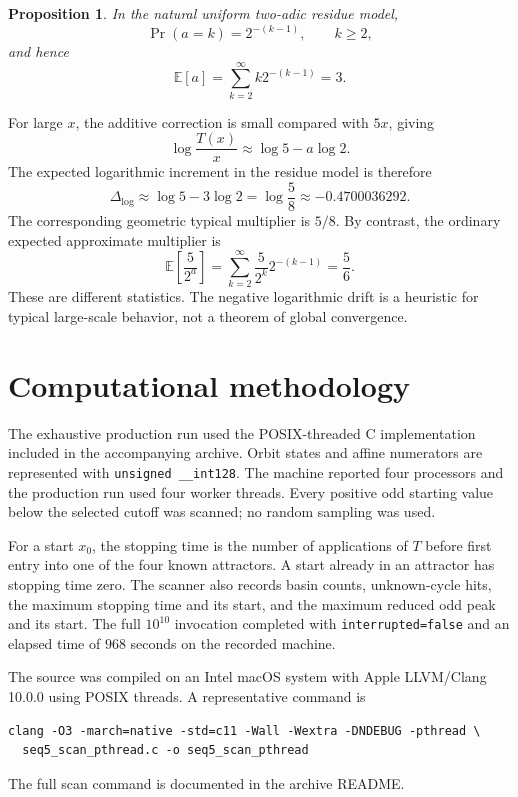 \documentclass[11pt]{article}
\newtheorem{proposition}{Proposition}
\begin{document}
\begin{proposition}
In the natural uniform two-adic residue model,
\begin{equation}
\Pr(a=k)=2^{-(k-1)},\qquad k\ge2,
\end{equation}
and hence
\begin{equation}
\mathbb E[a]=\sum_{k=2}^{\infty}k2^{-(k-1)}=3.
\end{equation}
\end{proposition}

For large $x$, the additive correction is small compared with $5x$, giving
\[
\log\frac{T(x)}x\approx\log5-a\log2.
\]
The expected logarithmic increment in the residue model is therefore
\begin{equation}
\Delta_{\log}\approx\log5-3\log2=\log\frac58\approx-0.4700036292.
\end{equation}
The corresponding geometric typical multiplier is $5/8$. By contrast, the ordinary expected approximate multiplier is
\[
\mathbb E\!\left[\frac5{2^a}\right]=\sum_{k=2}^{\infty}\frac5{2^k}2^{-(k-1)}=\frac56.
\]
These are different statistics. The negative logarithmic drift is a heuristic for typical large-scale behavior, not a theorem of global convergence.

\section{Computational methodology}
The exhaustive production run used the POSIX-threaded C implementation included in the accompanying archive. Orbit states and affine numerators are represented with \texttt{unsigned \_\_int128}. The machine reported four processors and the production run used four worker threads. Every positive odd starting value below the selected cutoff was scanned; no random sampling was used.

For a start $x_0$, the stopping time is the number of applications of $T$ before first entry into one of the four known attractors. A start already in an attractor has stopping time zero. The scanner also records basin counts, unknown-cycle hits, the maximum stopping time and its start, and the maximum reduced odd peak and its start. The full $10^{10}$ invocation completed with \texttt{interrupted=false} and an elapsed time of $968$ seconds on the recorded machine.

The source was compiled on an Intel macOS system with Apple LLVM/Clang 10.0.0 using POSIX threads. A representative command is
\begin{verbatim}
clang -O3 -march=native -std=c11 -Wall -Wextra -DNDEBUG -pthread \
  seq5_scan_pthread.c -o seq5_scan_pthread
\end{verbatim}
The full scan command is documented in the archive README.
\end{document}
